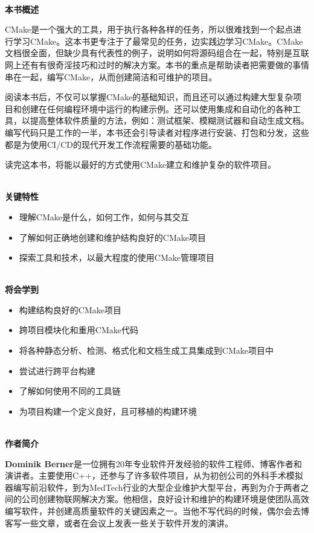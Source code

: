\documentclass[11pt,a4paper,UTF8]{book}
\begin{document}
\begin{sloppypar}
	\hspace*{\fill} \\ %
	\noindent\textbf{本书概述}
	
	CMake是一个强大的工具，用于执行各种各样的任务，所以很难找到一个起点进行学习CMake。这本书更专注于了最常见的任务，边实践边学习CMake。CMake文档很全面，但缺少具有代表性的例子，说明如何将源码组合在一起，特别是互联网上还有有很奇淫技巧和过时的解决方案。本书的重点是帮助读者把需要做的事情串在一起，编写CMake，从而创建简洁和可维护的项目。
	
	阅读本书后，不仅可以掌握CMake的基础知识，而且还可以通过构建大型复杂项目和创建在任何编程环境中运行的构建示例。还可以使用集成和自动化的各种工具，以提高整体软件质量的方法，例如：测试框架、模糊测试器和自动生成文档。编写代码只是工作的一半，本书还会引导读者对程序进行安装、打包和分发，这些都是为使用CI/CD的现代开发工作流程需要的基础功能。
	
	读完这本书，将能以最好的方式使用CMake建立和维护复杂的软件项目。
	
	
	\hspace*{\fill} \\ %
	\noindent\textbf{关键特性}
	\begin{itemize}
		\item 理解CMake是什么，如何工作，如何与其交互
		\item 了解如何正确地创建和维护结构良好的CMake项目
		\item 探索工具和技术，以最大程度的使用CMake管理项目
	\end{itemize}

	\hspace*{\fill} \\ %
	\noindent\textbf{将会学到}
	\begin{itemize}
		\item 构建结构良好的CMake项目
		\item 跨项目模块化和重用CMake代码
		\item 将各种静态分析、检测、格式化和文档生成工具集成到CMake项目中
		\item 尝试进行跨平台构建
		\item 了解如何使用不同的工具链
		\item 为项目构建一个定义良好，且可移植的构建环境
	\end{itemize}
	
	\hspace*{\fill} \\ %
	\noindent\textbf{作者简介}
	
	\textbf{Dominik Berner}是一位拥有20年专业软件开发经验的软件工程师、博客作者和演讲者。主要使用C++，还参与了许多软件项目，从为初创公司的外科手术模拟器编写前沿软件，到为MedTech行业的大型企业维护大型平台，再到为介于两者之间的公司创建物联网解决方案。他相信，良好设计和维护的构建环境是使团队高效编写软件，并创建高质量软件的关键因素之一。当他不写代码的时候，偶尔会去博客写一些文章，或者在会议上发表一些关于软件开发的演讲。
	

\end{sloppypar}
\end{document}
